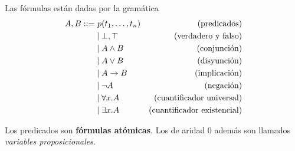 \begin{definition}[Fórmulas]
    Las fórmulas están dadas por la gramática
    \begin{align*}
        A, B ::=
         & \ p(t_1, \dots, t_n) & (\text{predicados})                \\
         & \mid \bot, \top             & \text{(verdadero y falso)}         \\
         & \mid A \wedge B        & \text{(conjunción)}                \\
         & \mid A \vee B         & \text{(disyunción)}                \\
         & \mid A \to B        & \text{(implicación)}               \\
         & \mid \neg A                 & \text{(negación)}                  \\
         & \mid \forall x . A        & \text{(cuantificador universal)}   \\
         & \mid \exists x . A        & \text{(cuantificador existencial)}
    \end{align*}

    Los predicados son \textbf{fórmulas atómicas}. Los de aridad 0 además son llamados \textit{variables proposicionales}.
\end{definition}

